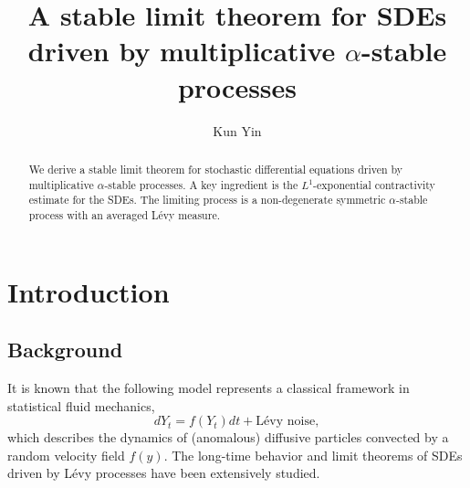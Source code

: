 \documentclass[11pt,reqno]{amsart}
\numberwithin{equation}{section}
\begin{document}
	
\allowdisplaybreaks


\title[Stable limit theorem]{A stable limit theorem for SDEs driven by multiplicative $\alpha$-stable processes}


\author{Kun Yin}


\address{\textbf{Kun Yin:} School of Mathematical Sciences, Shanghai Jiao Tong University, 200240 Shanghai, PR China.}












\allowdisplaybreaks



\begin{abstract}
We derive a stable limit theorem for stochastic differential equations driven by multiplicative $\alpha$-stable processes. A key ingredient is the $L^1$-exponential contractivity estimate for the SDEs. The limiting process is a non-degenerate symmetric $\alpha$-stable process with an averaged Lévy measure.


\end{abstract}

\maketitle







\section{Introduction}

\subsection{Background}
It is known that the following model represents a classical framework in statistical fluid mechanics,
$$
dY_t=f(Y_t)dt+\text{L\'evy noise},
$$
which describes the dynamics of (anomalous) diffusive particles convected by a random velocity field $f(y)$. The long-time behavior and limit theorems of SDEs driven by L\'evy processes have been extensively studied.
\end{document}
